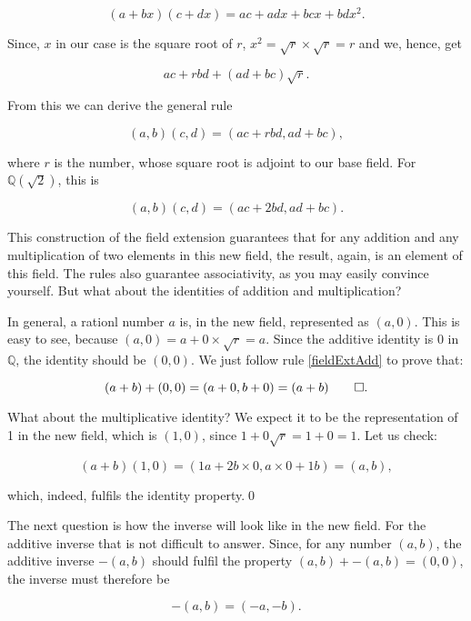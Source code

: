 \documentclass[tikz]{scrreprt}
\begin{document}
\[
(a+bx)(c+dx)=ac+adx+bcx+bdx^2.
\]

Since, $x$ in our case is the square root of $r$, 
$x^2=\sqrt{r}\times\sqrt{r}=r$ 
and we, hence, get

\[
ac+rbd+(ad+bc)\sqrt{r}.
\]

From this we can derive the general rule

\begin{equation}\label{fieldExtMul}
(a,b)(c,d) = (ac+rbd,ad+bc),
\end{equation}

where $r$ is the number, whose square root is adjoint to our base field.
For $\mathbb{Q}(\sqrt{2})$, this is 

\begin{equation}
(a,b)(c,d) = (ac+2bd,ad+bc).
\end{equation}

This construction of the field extension guarantees
that for any addition and any multiplication 
of two elements in this new field, the result, again,
is an element of this field.
The rules also guarantee associativity,
as you may easily convince yourself.
But what about the identities of addition and multiplication?

In general, a rationl number $a$ is, in the new field,
represented as $(a,0)$.
This is easy to see, 
because $(a,0) = a+0\times\sqrt{r} = a$.
Since the additive identity is 0
in $\mathbb{Q}$, the identity should be $(0,0)$.
We just follow rule \ref{fieldExtAdd}
to prove that:

\begin{equation}
(a+b)+(0,0) = (a+0,b+0) = (a+b)\qed.
\end{equation}

What about the multiplicative identity?
We expect it to be the representation of 1 in the new field,
which is $(1,0)$, since $1+0\sqrt{r} = 1+0 = 1$.
Let us check:

\begin{equation}
(a+b)(1,0) = (1a+2b\times0,a\times 0+1b) = (a,b),
\end{equation}

which, indeed, fulfils the identity property.\qed

The next question is how the inverse will look like
in the new field.
For the additive inverse that is not difficult to answer.
Since, for any number $(a,b)$, the additive inverse $-(a,b)$
should fulfil the property $(a,b) + -(a,b) = (0,0)$,
the inverse must therefore be

\begin{equation}
-(a,b) = (-a,-b).
\end{equation}
\end{document}
